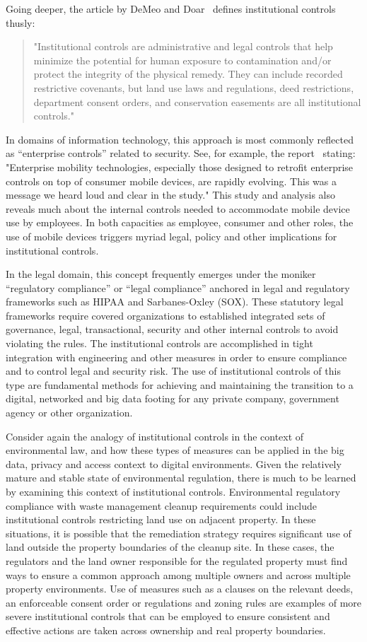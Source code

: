 Going deeper, the article by DeMeo and Doar~\cite{DeMeo2011} defines institutional controls thusly:
\begin{quote}
"Institutional controls are administrative and legal controls that help minimize the potential for human exposure to contamination and/or protect the integrity of the physical remedy. They can include recorded restrictive covenants, but land use laws and regulations, deed restrictions, department consent orders, and conservation easements are all institutional controls."
\end{quote}

In domains of information technology, this approach is most commonly reflected as ``enterprise controls'' related to security.
See, for example, the report~\cite{Juniper2012}
stating: "Enterprise mobility technologies, especially those designed to retrofit enterprise controls on top of consumer mobile devices, are rapidly evolving. This was a message we heard loud and clear in the study."
This study and analysis also reveals much about the internal controls needed to accommodate mobile device use by employees.
In both capacities as employee, consumer and other roles, the use of mobile devices triggers myriad legal, policy and other implications for institutional controls.

In the legal domain, this concept frequently emerges under the moniker ``regulatory compliance'' or ``legal compliance'' anchored in legal and regulatory frameworks such as HIPAA and Sarbanes-Oxley (SOX).
These statutory legal frameworks require covered organizations to established integrated sets of governance, legal, transactional, security and other internal controls to avoid violating the rules.
The institutional controls are accomplished in tight integration with engineering and other measures in order to ensure compliance and to control legal and security risk.
The use of institutional controls of this type are fundamental methods for achieving and maintaining the transition to a digital, networked and big data footing for any private company, government agency or other organization.

Consider again the analogy of institutional controls in the context of environmental law, and how these types of measures can be applied in the big data, privacy and access context to digital environments.
Given the relatively mature and stable state of environmental regulation, there is much to be learned by examining this context of institutional controls.
Environmental regulatory compliance with waste management cleanup requirements could include institutional controls restricting land use on adjacent property.
In these situations, it is possible that the remediation strategy requires significant use of land outside the property boundaries of the cleanup site. 
In these cases, the regulators and the land owner responsible for the regulated property must find ways to ensure a common approach among multiple owners and across multiple property environments.
Use of measures such as a clauses on the relevant deeds, an enforceable consent order or regulations and zoning rules are examples of more severe institutional controls that can be employed to ensure consistent and effective actions are taken across ownership and real property boundaries.

